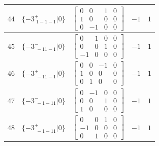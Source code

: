 \documentclass[fleqn,8pt]{jsarticle}
\begin{document}
\begin{longtable}{ccccc}
$ 44 $ & $ \{-3^{+}_{\,\,1-1-1}|0\} $ & $ \begin{bmatrix} 0 & 0 & 1 & 0 \\ 1 & 0 & 0 & 0 \\ 0 & -1 & 0 & 0 \end{bmatrix} $ & $ -1 $ & $ 1 $ \\ \hline
$ 45 $ & $ \{-3^{-}_{\,\,-11-1}|0\} $ & $ \begin{bmatrix} 0 & 1 & 0 & 0 \\ 0 & 0 & 1 & 0 \\ -1 & 0 & 0 & 0 \end{bmatrix} $ & $ -1 $ & $ 1 $ \\ \hline
$ 46 $ & $ \{-3^{+}_{\,\,-11-1}|0\} $ & $ \begin{bmatrix} 0 & 0 & -1 & 0 \\ 1 & 0 & 0 & 0 \\ 0 & 1 & 0 & 0 \end{bmatrix} $ & $ -1 $ & $ 1 $ \\ \hline
$ 47 $ & $ \{-3^{-}_{\,\,-1-11}|0\} $ & $ \begin{bmatrix} 0 & -1 & 0 & 0 \\ 0 & 0 & 1 & 0 \\ 1 & 0 & 0 & 0 \end{bmatrix} $ & $ -1 $ & $ 1 $ \\ \hline
$ 48 $ & $ \{-3^{+}_{\,\,-1-11}|0\} $ & $ \begin{bmatrix} 0 & 0 & 1 & 0 \\ -1 & 0 & 0 & 0 \\ 0 & 1 & 0 & 0 \end{bmatrix} $ & $ -1 $ & $ 1 $ \\
\end{longtable}
\end{document}
